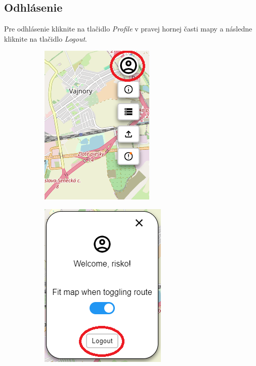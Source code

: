 \subsection{Odhlásenie}
Pre odhlásenie kliknite na tlačidlo \textit{Profile} v pravej hornej časti mapy a následne kliknite na tlačidlo \textit{Logout}.
\begin{figure}[H]
    \centering
    \begin{subfigure}{0.45\textwidth}
        \centering
        \includegraphics[width=.7\textwidth]{guide_includes/img/profile_button.png}
    \end{subfigure}
    \begin{subfigure}{0.45\textwidth}
        \centering
        \includegraphics[width=.7\textwidth]{guide_includes/img/logout_button.png}
    \end{subfigure}
\end{figure}


